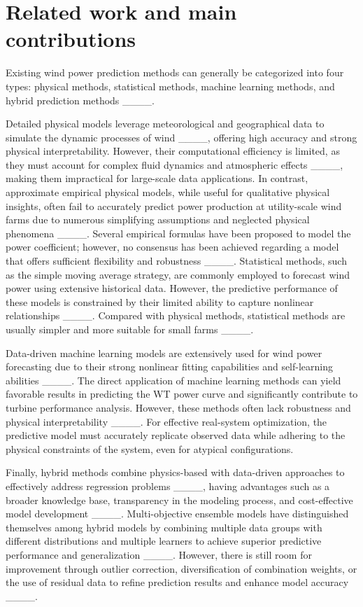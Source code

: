 \section{Related work and main contributions}
\label{sec:related-work}
Existing wind power prediction methods can generally be categorized into four types: physical methods, statistical methods, machine learning methods, and hybrid prediction methods ____.

Detailed physical models leverage meteorological and geographical data to simulate the dynamic processes of wind ____, offering high accuracy and strong physical interpretability. However, their computational efficiency is limited, as they must account for complex fluid dynamics and atmospheric effects ____, making them impractical for large-scale data applications. In contrast, approximate empirical physical models, while useful for qualitative physical insights, often fail to accurately predict power production at utility-scale wind farms due to numerous simplifying assumptions and neglected physical phenomena ____. Several empirical formulas have been proposed to model the power coefficient; however, no consensus has been achieved regarding a model that offers sufficient flexibility and robustness ____. Statistical methods, such as the simple moving average strategy, are commonly employed to forecast wind power using extensive historical data. However, the predictive performance of these models is constrained by their limited ability to capture nonlinear relationships ____. Compared with physical methods, statistical methods are usually simpler and more suitable for small farms ____.

Data-driven machine learning models are extensively used for wind power forecasting due to their strong nonlinear fitting capabilities and self-learning abilities ____. The direct application of machine learning methods can yield favorable results in predicting the WT power curve and significantly contribute to turbine performance analysis. However, these methods often lack robustness and physical interpretability ____. For effective real-system optimization, the predictive model must accurately replicate observed data while adhering to the physical constraints of the system, even for atypical configurations.

Finally, hybrid methods combine physics-based with data-driven approaches to effectively address regression problems ____, having advantages such as a broader knowledge base, transparency in the modeling process, and cost-effective model development ____. Multi-objective ensemble models have distinguished themselves among hybrid models by combining multiple data groups with different distributions and multiple learners to achieve superior predictive performance and generalization ____. However, there is still room for improvement through outlier correction, diversification of combination weights, or the use of residual data to refine prediction results and enhance model accuracy ____. 


